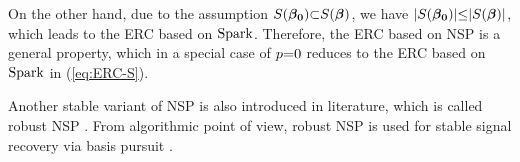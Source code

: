 On the other hand, due to the assumption $S(\boldsymbol{\beta_0}) {\subset} S(\boldsymbol{\beta})$, we have $|S(\boldsymbol{\beta_0})| {\leq} |S(\boldsymbol{\beta})|$, which leads to the ERC based on $\mathrm{Spark}$.
Therefore, the ERC based on NSP is a general property, which in a special case of $p {=} 0$ reduces to the ERC based on $\mathrm{Spark}$ in (\ref{eq:ERC-S}).

Another stable variant of NSP is also introduced in literature, which is called robust NSP \cite{Davies2009a,Foucart2013}. 
From algorithmic point of view, robust NSP is used for stable signal recovery via basis pursuit \cite{Foucart2013}.
